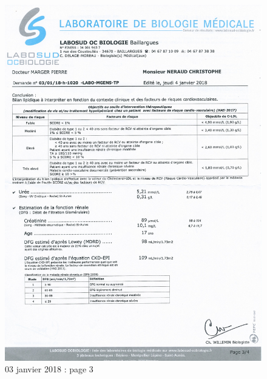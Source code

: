 \documentclass[12pt]{article}
\begin{document}
	\begin{figure}[!h]
		\begin{center}
		\includegraphics[scale=0.79]{03-01-2018/p3.JPG}
		\end{center}
		\caption{03 janvier 2018 : page 3}
	\end{figure}
	
\end{document}

